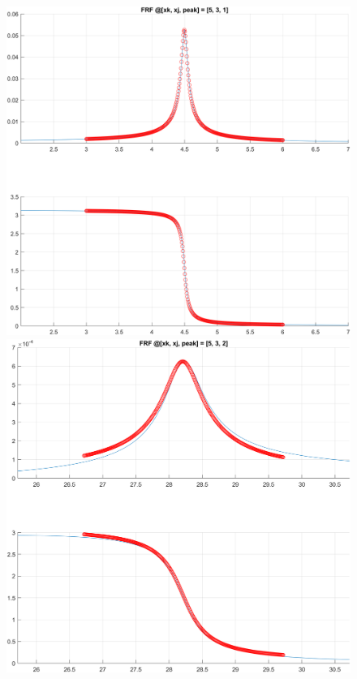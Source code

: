 \begin{figure}[H]
    \begin{minipage}[b]{0.45\textwidth}
        \centering
        \includegraphics[width=\textwidth]{img/MATLAB/Part_A/Comparison_FRF_couple_3_5_zoom_peak_01.png}
    \end{minipage}
    \hfill
    \begin{minipage}[b]{0.45\textwidth}
        \centering
        \includegraphics[width=\textwidth]{img/MATLAB/Part_A/Comparison_FRF_couple_3_5_zoom_peak_02.png}

\end{minipage}
\end{figure}
